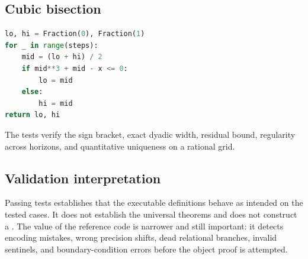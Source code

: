 \subsection{Cubic bisection}

\begin{lstlisting}[language=Python]
lo, hi = Fraction(0), Fraction(1)
for _ in range(steps):
    mid = (lo + hi) / 2
    if mid**3 + mid - x <= 0:
        lo = mid
    else:
        hi = mid
return lo, hi
\end{lstlisting}
The tests verify the sign bracket, exact dyadic width, residual bound,
regularity across horizons, and quantitative uniqueness on a rational grid.

\subsection{Validation interpretation}

Passing tests establishes that the executable definitions behave as intended
on the tested cases.  It does not establish the universal theorems and does
not construct a .  The value of the reference code is narrower
and still important: it detects encoding mistakes, wrong precision shifts,
dead relational branches, invalid sentinels, and boundary-condition errors
before the object proof is attempted.
